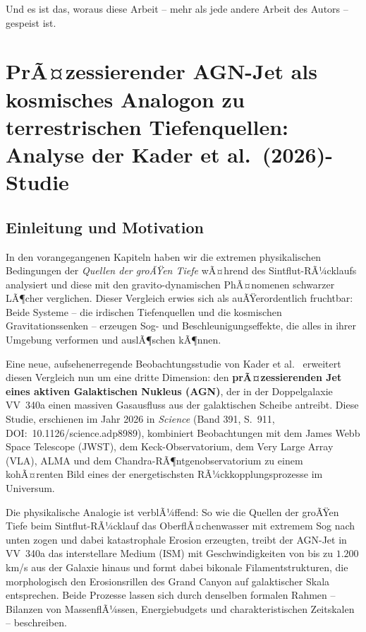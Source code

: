 ﻿\documentclass[12pt,a4paper]{report}
\begin{document}
Und es ist das, woraus diese Arbeit -- mehr als jede andere Arbeit des Autors -- gespeist ist.



\chapter{PrÃ¤zessierender AGN-Jet als kosmisches Analogon zu terrestrischen Tiefenquellen: Analyse der Kader et al.\ (2026)-Studie}
\label{chap:agn_jet}

\section{Einleitung und Motivation}

In den vorangegangenen Kapiteln haben wir die extremen physikalischen Bedingungen der \textit{Quellen der groÃŸen Tiefe} wÃ¤hrend des Sintflut-RÃ¼cklaufs analysiert und diese mit den gravito-dynamischen PhÃ¤nomenen schwarzer LÃ¶cher verglichen. Dieser Vergleich erwies sich als auÃŸerordentlich fruchtbar: Beide Systeme -- die irdischen Tiefenquellen und die kosmischen Gravitationssenken -- erzeugen Sog- und Beschleunigungseffekte, die alles in ihrer Umgebung verformen und auslÃ¶schen kÃ¶nnen.

Eine neue, aufsehenerregende Beobachtungsstudie von Kader et al.\ \cite{kader2026} erweitert diesen Vergleich nun um eine dritte Dimension: den \textbf{prÃ¤zessierenden Jet eines aktiven Galaktischen Nukleus (AGN)}, der in der Doppelgalaxie VV~340a einen massiven Gasausfluss aus der galaktischen Scheibe antreibt. Diese Studie, erschienen im Jahr 2026 in \textit{Science} (Band 391, S.\ 911, DOI:~10.1126/science.adp8989), kombiniert Beobachtungen mit dem James Webb Space Telescope (JWST), dem Keck-Observatorium, dem Very Large Array (VLA), ALMA und dem Chandra-RÃ¶ntgenobservatorium zu einem kohÃ¤renten Bild eines der energetischsten RÃ¼ckkopplungsprozesse im Universum.

Die physikalische Analogie ist verblÃ¼ffend: So wie die Quellen der groÃŸen Tiefe beim Sintflut-RÃ¼cklauf das OberflÃ¤chenwasser mit extremem Sog nach unten zogen und dabei katastrophale Erosion erzeugten, treibt der AGN-Jet in VV~340a das interstellare Medium (ISM) mit Geschwindigkeiten von bis zu $1.200$\,km/s aus der Galaxie hinaus und formt dabei bikonale Filamentstrukturen, die morphologisch den Erosionsrillen des Grand Canyon auf galaktischer Skala entsprechen. Beide Prozesse lassen sich durch denselben formalen Rahmen -- Bilanzen von MassenflÃ¼ssen, Energiebudgets und charakteristischen Zeitskalen -- beschreiben.
\end{document}
